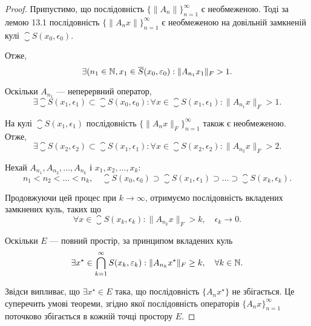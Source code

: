 \begin{proof}
Припустимо, що послідовність $\{\|A_n\|\}_{n = 1}^\infty$ є необмеженою.
Тоді за лемою 13.1 послідовність $\{\|A_n x\|\}_{n = 1}^\infty$
є необмеженою на довільній замкненій кулі $\closure S(x_0, \epsilon_0)$.

Отже, 
\begin{equation*}
    \exists (n_1 \in \mathbb{N}, x_1 \in \overline{S}(x_0, \varepsilon_0): \|A_{n_1} x_1\|_F > 1.    
\end{equation*}

Оскільки $A_{n_1}$ --- неперервний оператор,
\begin{equation*}
    \exists \closure S(x_1, \epsilon_1) \subset \closure S(x_0, \epsilon_0):
    \forall x \in \closure S(x_1, \epsilon_1): \|A_{n_1} x\|_F > 1.
\end{equation*}

На кулі $\closure S(x_1, \epsilon_1)$ послідовність $\{\|A_n x\|_F\}_{n = 1}^\infty$
також є необмеженою. Отже,
\begin{equation*}
    \exists \closure S(x_2, \epsilon_2) \subset \closure S(x_1, \epsilon_1):
    \forall x \in \closure S(x_2, \epsilon_2): \|A_{n_2} x\|_F > 2.
\end{equation*}

Нехай $A_{n_1}, A_{n_2}, \dots, A_{n_k}$ і $x_1, x_2, \dots, x_k$:
\begin{equation*}
    n_1 < n_2 < \dots < n_k, \quad
    \closure S(x_0, \epsilon_0) \supset 
    \closure S(x_1, \epsilon_1) \supset
    \dots \supset \closure S(x_k, \epsilon_k).
\end{equation*}

Продовжуючи цей процес при $k \to \infty$, отримуємо
послідовність вкладених замкнених куль, таких що
\begin{equation*}
    \forall x \in \closure S(x_k, \epsilon_k): \|A_{n_k} x\|_F > k, \quad \epsilon_k \to 0.
\end{equation*}

Оскільки $E$ --- повний простір, за принципом вкладених куль
\begin{equation*}
    \exists x^\star \in \operatorname*{\bigcap}_{k = 1}^\infty S(x_k, \varepsilon_k):
    \|A_{n_k} x^\star\|_F \ge k, \quad \forall k \in \mathbb{N}.
\end{equation*}

Звідси випливає, що $\exists x^\star \in E$ така, що послідовність $\{A_n x^\star\}$
не збігається. Це суперечить умові теореми, згідно якої
послідовність операторів $\{A_n x\}_{n = 1}^\infty$
поточково збігається в кожній точці простору $E$.


\end{proof}
